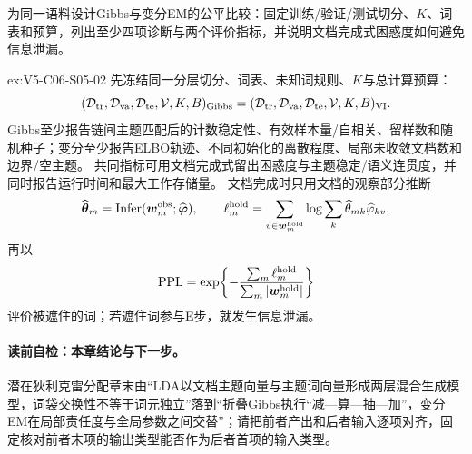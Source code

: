 \begin{SLChapterExercisePairSection}
\begin{exercise}\label{ex:V5-C06-S05-02}
为同一语料设计Gibbs与变分EM的公平比较：固定训练/验证/测试切分、$K$、词表和预算，列出至少四项诊断与两个评价指标，并说明文档完成式困惑度如何避免信息泄漏。
\end{exercise}
\ifSLFullEdition
{}\label{sol:V5-C06-S05-02}
\begin{chapterexercisesolution}{ex:V5-C06-S05-02}
\nopagebreak[4]
先冻结同一分层切分、词表、未知词规则、$K$与总计算预算：
\[
(\mathcal D_{\rm tr},\mathcal D_{\rm va},\mathcal D_{\rm te},
\mathcal V,K,B)_{\rm Gibbs}
=(\mathcal D_{\rm tr},\mathcal D_{\rm va},\mathcal D_{\rm te},
\mathcal V,K,B)_{\rm VI}.
\]
Gibbs至少报告链间主题匹配后的计数稳定性、有效样本量/自相关、留样数和随机种子；变分至少报告ELBO轨迹、不同初始化的离散程度、局部未收敛文档数和边界/空主题。
共同指标可用文档完成式留出困惑度与主题稳定/语义连贯度，并同时报告运行时间和最大工作存储量。
文档完成时只用文档的观察部分推断
\[
\widehat{\boldsymbol\theta}_m
=\operatorname{Infer}(\boldsymbol w_m^{\rm obs};\widehat{\boldsymbol\varphi}),
\qquad
\ell_m^{\rm hold}
=\sum_{v\in\boldsymbol w_m^{\rm hold}}
\log\sum_k\widehat\theta_{mk}\widehat\varphi_{kv},
\]
再以
\[
\operatorname{PPL}
=\exp\!\left\{-\frac{\sum_m\ell_m^{\rm hold}}
{\sum_m|\boldsymbol w_m^{\rm hold}|}\right\}
\]
评价被遮住的词；若遮住词参与E步，就发生信息泄漏。
\end{chapterexercisesolution}
\fi

\end{SLChapterExercisePairSection}
\paragraph{读前自检：本章结论与下一步。}潜在狄利克雷分配章末由“LDA以文档主题向量与主题词向量形成两层混合生成模型，词袋交换性不等于词元独立”落到“折叠Gibbs执行“减—算—抽—加”，变分EM在局部责任度与全局参数之间交替”；请把前者产出和后者输入逐项对齐，固定核对前者末项的输出类型能否作为后者首项的输入类型。\par

